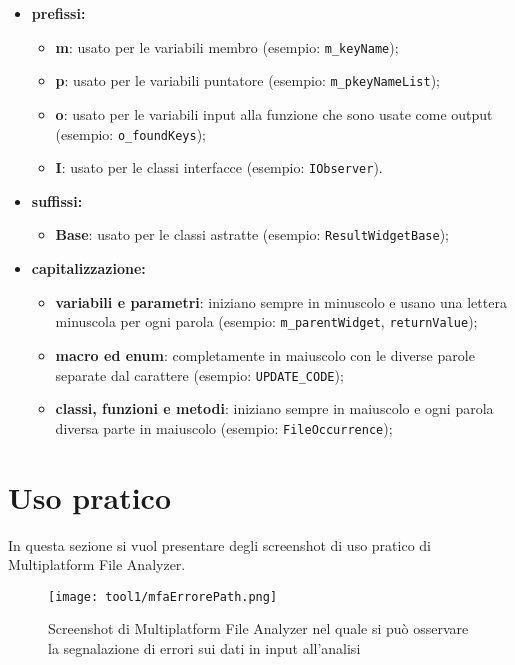 	\begin{itemize}
		\item \textbf{prefissi:}
		\begin{itemize}
			\item \textbf{m}: usato per le variabili membro (esempio: \texttt{m\_keyName});
			\item \textbf{p}: usato per le variabili puntatore (esempio: \texttt{m\_pkeyNameList});
			\item \textbf{o}: usato per le variabili input alla funzione che sono usate come output (esempio: \texttt{o\_foundKeys});
			\item \textbf{I}: usato per le classi interfacce (esempio: \texttt{IObserver}).
		\end{itemize}
		\item \textbf{suffissi:}
		\begin{itemize}
			\item \textbf{Base}: usato per le classi astratte (esempio: \texttt{ResultWidgetBase});
		\end{itemize}
		\item \textbf{capitalizzazione:}
		\begin{itemize}
			\item \textbf{variabili e parametri}: iniziano sempre in minuscolo e usano una lettera minuscola per ogni parola (esempio: \texttt{m\_parentWidget}, \texttt{returnValue});
			\item \textbf{macro ed enum}: completamente in maiuscolo con le diverse parole separate dal carattere \sq{\_} (esempio: \texttt{UPDATE\_CODE});
			\item \textbf{classi, funzioni e metodi}: iniziano sempre in maiuscolo e ogni parola diversa parte in maiuscolo (esempio: \texttt{FileOccurrence});
		\end{itemize}
	\end{itemize}
	
\section{Uso pratico}
	In questa sezione si vuol presentare degli screenshot di uso pratico di Multiplatform File Analyzer.
	
	\begin{figure}[!h] 
		\centering 
		\texttt{[image: tool1/mfaErrorePath.png]} 
		\caption{Screenshot di Multiplatform File Analyzer nel quale si può osservare la segnalazione di errori sui dati in input all'analisi}
	\end{figure}
	

